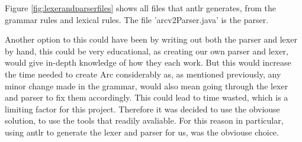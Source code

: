 Figure \ref{fig:lexerandparserfiles} shows all files that \gls{antlr} generates, from the grammar rules and lexical rules. The file 'arcv2Parser.java' is the parser.


Another option to this could have been by writing out both the parser and lexer by hand, this could be very educational, as creating our own parser and lexer, would give in-depth knowledge of how they each work. But this would increase the time needed to create Arc considerably as, as mentioned previously, any minor change made in the grammar, would also mean going through the lexer and parser to fix them accordingly. This could lead to time wasted, which is a limiting factor for this project. Therefore it was decided to use the obviouse solution, to use the tools that readily avaliable. For this reason in particular, using \gls{antlr} to generate the lexer and parser for us, was the obviouse choice. 






